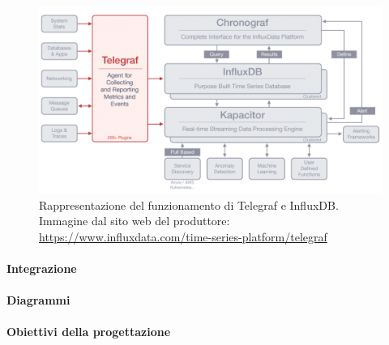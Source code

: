 \begin{figure}[H]
	\begin{center}
		\includegraphics[scale=0.25]{./images/influxTelegraf.jpg}
		\caption{Rappresentazione del funzionamento di Telegraf e InfluxDB. Immagine dal sito web del produttore: \url{https://www.influxdata.com/time-series-platform/telegraf}}
	\end{center}
\end{figure}



\paragraph{Integrazione}

\paragraph{Diagrammi}

\paragraph{Obiettivi della progettazione}